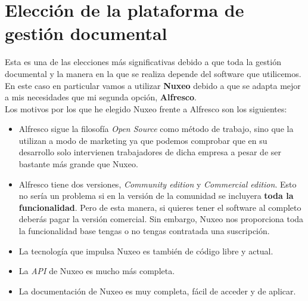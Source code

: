 \chapter{Elección de la plataforma de gestión documental}

Esta es una de las elecciones más significativas debido a que toda la gestión documental
y la manera en la que se realiza depende del software que utilicemos.
\\

En este caso en particular vamos a utilizar \textbf{Nuxeo} debido a que se adapta mejor a mis
necesidades que mi segunda opción, \textbf{Alfresco}.
\\

Los motivos por los que he elegido Nuxeo frente a Alfresco son los siguientes:

\begin{itemize}
	\item Alfresco sigue la filosofía \textit{Open Source} como método de trabajo, sino que la utilizan a modo de marketing
	 			ya que podemos comprobar que en su desarrollo solo intervienen trabajadores de dicha empresa a pesar de ser bastante
				más grande que Nuxeo.
	\item Alfresco tiene dos versiones, \textit{Community edition} y \textit{Commercial edition}. Esto no sería un problema
				si en la versión de la comunidad se incluyera \textbf{toda la funcionalidad}. Pero de esta manera, si quieres tener
				el software al completo deberás pagar la versión comercial. Sin embargo, Nuxeo nos proporciona toda la funcionalidad
				base tengas o no tengas contratada una suscripción.
	\item La tecnología que impulsa Nuxeo es también de código libre y actual.
	\item La \textit{API} de Nuxeo es mucho más completa.
	\item La documentación de Nuxeo es muy completa, fácil de acceder y de aplicar.
\end{itemize}

